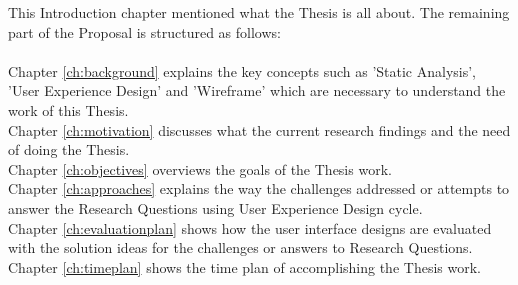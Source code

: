 This Introduction chapter mentioned what the Thesis is all about. The remaining part of the Proposal is structured as follows: \\ \\

\noindent Chapter \ref{ch:background} explains the key concepts such as 'Static Analysis', 'User Experience Design' and 'Wireframe' which are necessary to understand the work of this Thesis. \\ 
Chapter \ref{ch:motivation} discusses what the current research findings and the need of doing the Thesis. \\
Chapter \ref{ch:objectives} overviews the goals of the Thesis work. \\
Chapter \ref{ch:approaches} explains the way the challenges addressed or attempts to answer the Research Questions using User Experience Design cycle. \\
Chapter \ref{ch:evaluationplan} shows how the user interface designs are evaluated with the solution ideas for the challenges or answers to Research Questions. \\
Chapter \ref{ch:timeplan} shows the time plan of accomplishing the Thesis work. \\ \\


\let\cleardoublepage\clearpage
